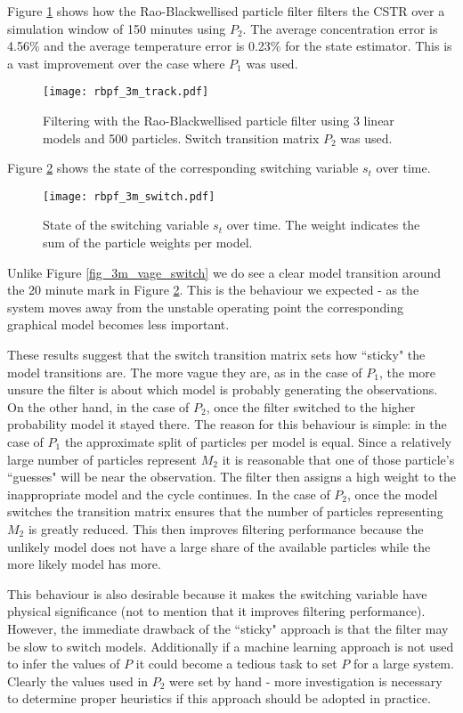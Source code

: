 Figure \ref{fig_3m_track} shows how the Rao-Blackwellised particle filter filters the CSTR over a simulation window of 150 minutes using $P_2$. The average concentration error is 4.56\% and the average temperature error is 0.23\% for the state estimator. This is a vast improvement over the case where $P_1$ was used.
\begin{figure}[H] 
\centering
\texttt{[image: rbpf\_3m\_track.pdf]}
\caption{Filtering with the Rao-Blackwellised particle filter using 3 linear models and 500 particles. Switch transition matrix $P_2$ was used.}
\label{fig_3m_track}
\end{figure}
Figure \ref{fig_3m_switch} shows the state of the corresponding switching variable $s_t$ over time.
\begin{figure}[H] 
\centering
\texttt{[image: rbpf\_3m\_switch.pdf]}
\caption{State of the switching variable $s_t$ over time. The weight indicates the sum of the particle weights per model.}
\label{fig_3m_switch}
\end{figure}
Unlike Figure \ref{fig_3m_vage_switch} we do see a clear model transition around the 20 minute mark in Figure \ref{fig_3m_switch}. This is the behaviour we expected - as the system moves away from the unstable operating point the corresponding graphical model becomes less important.

These results suggest that the switch transition matrix sets how ``sticky" the model transitions are. The more vague they are, as in the case of $P_1$, the more unsure the filter is about which model is probably generating the observations. On the other hand, in the case of $P_2$, once the filter switched to the higher probability model it stayed there. The reason for this behaviour is simple: in the case of $P_1$ the approximate split of particles per model is equal. Since a relatively large number of particles represent $M_2$ it is reasonable that one of those particle's ``guesses" will be near the observation. The filter then assigns a high weight to the inappropriate model and the cycle continues. In the case of $P_2$, once the model switches the transition matrix ensures that the number of particles representing $M_2$ is greatly reduced. This then improves filtering performance because the unlikely model does not have a large share of the available particles while the more likely model has more.

This behaviour is also desirable because it makes the switching variable have physical significance (not to mention that it improves filtering performance). However, the immediate drawback of the ``sticky" approach is that the filter may be slow to switch models. Additionally if a machine learning approach is not used to infer the values of $P$ it could become a tedious task to set $P$ for a large system. Clearly the values used in $P_2$ were set by hand - more investigation is necessary to determine proper heuristics if this approach should be adopted in practice.

